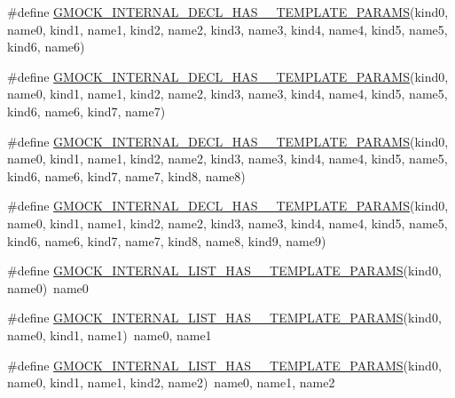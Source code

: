 \begin{DoxyCompactItemize}
\item 
\#define \mbox{\hyperlink{googletest-master_2googlemock_2include_2gmock_2gmock-generated-actions_8h_aaafa5e8b1a116aa8e7f88653415e60cd}{G\+M\+O\+C\+K\+\_\+\+I\+N\+T\+E\+R\+N\+A\+L\+\_\+\+D\+E\+C\+L\+\_\+\+H\+A\+S\+\_\+\_\+\+T\+E\+M\+P\+L\+A\+T\+E\+\_\+\+P\+A\+R\+A\+MS}}(kind0,  name0,  kind1,  name1,  kind2,  name2,  kind3,  name3,  kind4,  name4,  kind5,  name5,  kind6,  name6)
\item 
\#define \mbox{\hyperlink{googletest-master_2googlemock_2include_2gmock_2gmock-generated-actions_8h_a8d8ec2523daa6fc6c5b8f6a45898e0b1}{G\+M\+O\+C\+K\+\_\+\+I\+N\+T\+E\+R\+N\+A\+L\+\_\+\+D\+E\+C\+L\+\_\+\+H\+A\+S\+\_\+\_\+\+T\+E\+M\+P\+L\+A\+T\+E\+\_\+\+P\+A\+R\+A\+MS}}(kind0,  name0,  kind1,  name1,  kind2,  name2,  kind3,  name3,  kind4,  name4,  kind5,  name5,  kind6,  name6,  kind7,  name7)
\item 
\#define \mbox{\hyperlink{googletest-master_2googlemock_2include_2gmock_2gmock-generated-actions_8h_ae6dd478ff5757fa4e66ef2dcf6e22325}{G\+M\+O\+C\+K\+\_\+\+I\+N\+T\+E\+R\+N\+A\+L\+\_\+\+D\+E\+C\+L\+\_\+\+H\+A\+S\+\_\+\_\+\+T\+E\+M\+P\+L\+A\+T\+E\+\_\+\+P\+A\+R\+A\+MS}}(kind0,  name0,  kind1,  name1,  kind2,  name2,  kind3,  name3,  kind4,  name4,  kind5,  name5,  kind6,  name6,  kind7,  name7,  kind8,  name8)
\item 
\#define \mbox{\hyperlink{googletest-master_2googlemock_2include_2gmock_2gmock-generated-actions_8h_aa3db5758c68ca3a45a795d91fea7bb42}{G\+M\+O\+C\+K\+\_\+\+I\+N\+T\+E\+R\+N\+A\+L\+\_\+\+D\+E\+C\+L\+\_\+\+H\+A\+S\+\_\+\_\+\+T\+E\+M\+P\+L\+A\+T\+E\+\_\+\+P\+A\+R\+A\+MS}}(kind0,  name0,  kind1,  name1,  kind2,  name2,  kind3,  name3,  kind4,  name4,  kind5,  name5,  kind6,  name6,  kind7,  name7,  kind8,  name8,  kind9,  name9)
\item 
\#define \mbox{\hyperlink{googletest-master_2googlemock_2include_2gmock_2gmock-generated-actions_8h_a900f637cda387230021133903f5e078b}{G\+M\+O\+C\+K\+\_\+\+I\+N\+T\+E\+R\+N\+A\+L\+\_\+\+L\+I\+S\+T\+\_\+\+H\+A\+S\+\_\+\_\+\+T\+E\+M\+P\+L\+A\+T\+E\+\_\+\+P\+A\+R\+A\+MS}}(kind0,  name0)~name0
\item 
\#define \mbox{\hyperlink{googletest-master_2googlemock_2include_2gmock_2gmock-generated-actions_8h_ab89cb2aad7a5ededf9397ffd58fb8a9a}{G\+M\+O\+C\+K\+\_\+\+I\+N\+T\+E\+R\+N\+A\+L\+\_\+\+L\+I\+S\+T\+\_\+\+H\+A\+S\+\_\+\_\+\+T\+E\+M\+P\+L\+A\+T\+E\+\_\+\+P\+A\+R\+A\+MS}}(kind0,  name0,  kind1,  name1)~name0, name1
\item 
\#define \mbox{\hyperlink{googletest-master_2googlemock_2include_2gmock_2gmock-generated-actions_8h_a1f3bd0693e586000f0b8a5324183b47f}{G\+M\+O\+C\+K\+\_\+\+I\+N\+T\+E\+R\+N\+A\+L\+\_\+\+L\+I\+S\+T\+\_\+\+H\+A\+S\+\_\+\_\+\+T\+E\+M\+P\+L\+A\+T\+E\+\_\+\+P\+A\+R\+A\+MS}}(kind0,  name0,  kind1,  name1,  kind2,  name2)~name0, name1, name2

\end{DoxyCompactItemize}
